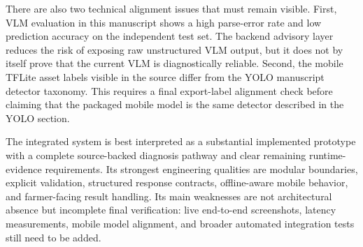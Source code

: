 There are also two technical alignment issues that must remain visible. First, VLM evaluation in
this manuscript shows a high parse-error rate and low prediction accuracy on the independent test
set. The backend advisory layer reduces the risk of exposing raw unstructured VLM output, but it
does not by itself prove that the current VLM is diagnostically reliable. Second, the mobile
TFLite asset labels visible in the source differ from the YOLO manuscript detector taxonomy. This
requires a final export-label alignment check before claiming that the packaged mobile model is
the same detector described in the YOLO section.

\begin{table}[H]
\centering
\caption{Integrated system evidence status}
\label{tab:integrated-evidence-status}
\small
{}
\end{table}


The integrated system is best interpreted as a substantial implemented prototype with a complete
source-backed diagnosis pathway and clear remaining runtime-evidence requirements. Its strongest
engineering qualities are modular boundaries, explicit validation, structured response contracts,
offline-aware mobile behavior, and farmer-facing result handling. Its main weaknesses are not
architectural absence but incomplete final verification: live end-to-end screenshots, latency
measurements, mobile model alignment, and broader automated integration tests still need to be
added.

